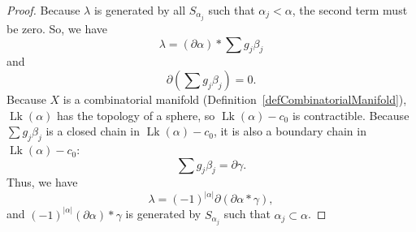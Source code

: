 \documentclass[reprint, amsmath, amssymb, showpacs, floatfix, longbibliography, aps, twocolumn, superscriptaddress, nofootinbib]{revtex4-2}
\theoremstyle{definition}
\begin{document}
\begin{proof}
	 Because $\lambda$ is generated by all $S_{\alpha_j}$ such that $\alpha_j<\alpha$, the second term must be zero. So, we have
	 \begin{equation}
	 	\lambda=(\partial\alpha)*\sum g_j\beta_j
	 \end{equation}
	 and 
	 \begin{equation}
	 	\partial(\sum g_j\beta_j)=0.
	 \end{equation}
	 Because $X$ is a combinatorial manifold (Definition~\ref{defCombinatorialManifold}), $\operatorname{Lk}(\alpha)$ has the topology of a sphere, so $\operatorname{Lk}(\alpha)-c_0$ is contractible. Because $\sum g_j\beta_j$ is a closed chain in $\operatorname{Lk}(\alpha)-c_0$, it is also a boundary chain in $\operatorname{Lk}(\alpha)-c_0$:
	 \begin{equation}
	 	\sum g_j\beta_j=\partial \gamma.
	 \end{equation}
	 Thus, we have
	 \begin{equation}
	 	\lambda=(-1)^{|\alpha|}\partial (\partial\alpha*\gamma),
	 \end{equation}
	and $(-1)^{|\alpha|}(\partial\alpha)*\gamma$ is generated by $S_{\alpha_j}$ such that $\alpha_j\subset \alpha$.
\end{proof}
\end{document}
